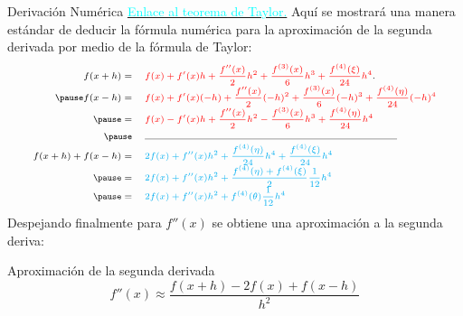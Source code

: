 \begin{frame}{Derivación Numérica}
\small
\label{DeduccionFormulaSegundoOrden}
\hyperlink{TeoremaTaylor}{\textcolor{cyan}{Enlace al teorema de Taylor.}}
\indent Aquí se mostrará una manera estándar de deducir la fórmula numérica para la aproximación de la segunda derivada por medio de la fórmula de Taylor:
\begin{displaymath}
\scriptsize
\begin{array}{rl}
\renewcommand{\arraystretch}{1.5}
f(x+h)= &\textcolor{red}{f(x)+f'(x)h+\dfrac{f''(x)}{2}h^2+\dfrac{f^{(3)}(x)}{6}h^3+\dfrac{f^{(4)}(\xi)}{24}h^4}.\\\pause
f(x-h)=&\textcolor{red}{f(x)+f'(x)(-h)+\dfrac{f''(x)}{2}(-h)^2+\dfrac{f^{(3)}(x)}{6}(-h)^3+\dfrac{f^{(4)}(\eta)}{24}(-h)^4}\\\pause
=&\textcolor{red}{f(x)-f'(x)h+\dfrac{f''(x)}{2}h^2-\dfrac{f^{(3)}(x)}{6}h^3+\dfrac{f^{(4)}(\eta)}{24}h^4}\\\pause
&\rule{7cm}{0.01cm}\\
f(x+h)+f(x-h)=&\textcolor{cyan}{2f(x)+f''(x)h^2+\dfrac{f^{(4)}(\eta)}{24}h^4+\dfrac{f^{(4)}(\xi)}{24}h^4}\\\pause
=&\textcolor{cyan}{2f(x)+f''(x)h^2+\dfrac{f^{(4)}(\eta)+f^{(4)}(\xi)}{2}\dfrac{1}{12}h^4}\\\pause
=&\textcolor{cyan}{2f(x)+f''(x)h^2+f^{(4)}(\theta)\dfrac{1}{12}h^4}\\
\end{array}
\end{displaymath}
Despejando finalmente para $f''(x)$ se obtiene una aproximación a la segunda deriva:
\begin{block}{Aproximación de la segunda derivada}
$$f''(x)\approx\dfrac{f(x+h)-2f(x)+f(x-h)}{h^2}$$
\end{block}
\end{frame}
